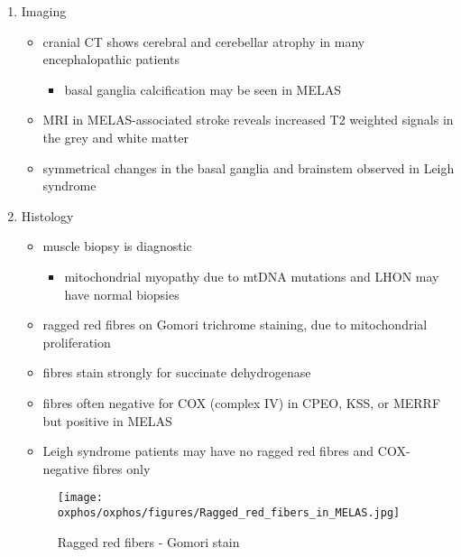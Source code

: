 \documentclass{scrartcl}
\begin{document}
\begin{enumerate}
\item Imaging
\label{sec:org17d0004}
\begin{itemize}
\item cranial CT shows cerebral and cerebellar atrophy in many encephalopathic patients
\begin{itemize}
\item basal ganglia calcification may be seen in MELAS
\end{itemize}
\item MRI in MELAS-associated stroke reveals increased T2 weighted signals in the grey and white matter
\item symmetrical changes in the basal ganglia and brainstem observed in Leigh syndrome
\end{itemize}

\item Histology
\label{sec:org4aa10a4}
\begin{itemize}
\item muscle biopsy is diagnostic
\begin{itemize}
\item mitochondrial myopathy due to mtDNA mutations and LHON may have normal biopsies
\end{itemize}
\item ragged red fibres on Gomori trichrome staining, due to mitochondrial proliferation
\item fibres stain strongly for succinate dehydrogenase
\item fibres often negative for COX (complex IV) in CPEO, KSS, or MERRF but positive in MELAS
\item Leigh syndrome patients may have no ragged red fibres and  COX-negative fibres only
\end{itemize}

\begin{figure}[htbp]
\centering
\texttt{[image: oxphos/oxphos/figures/Ragged\_red\_fibers\_in\_MELAS.jpg]}
\caption[rrf]{\label{fig:orgf51b17a}Ragged red fibers - Gomori stain}
\end{figure}


\end{enumerate}
\end{document}
